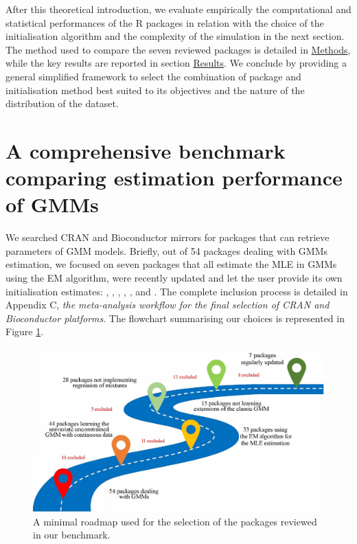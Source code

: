 After this theoretical introduction, we evaluate empirically the
computational and statistical performances of the R packages in relation
with the choice of the initialisation algorithm and the complexity of
the simulation in the next section. The method used to compare the seven reviewed
packages is detailed in \protect\hyperlink{methods}{Methods}, while the key results are reported in
section \protect\hyperlink{results}{Results}. We conclude by providing a general simplified
framework to select the combination of package and initialisation method best suited to its objectives and the nature of the distribution of the dataset.

\hypertarget{a-comprehensive-benchmark-comparing-estimation-performance-of-gmms}{%
\section{A comprehensive benchmark comparing estimation performance of GMMs}\label{a-comprehensive-benchmark-comparing-estimation-performance-of-gmms}}

We searched CRAN and Bioconductor mirrors for packages that can retrieve
parameters of GMM models. Briefly, out of 54 packages dealing with GMMs
estimation, we focused on seven packages that all estimate the
MLE in GMMs using the EM algorithm, were recently
updated and let the user provide its own initialisation estimates:
, , ,
, ,  and . The
complete inclusion process is detailed in Appendix C, \emph{the meta-analysis workflow for the final selection of CRAN and Bioconductor platforms}. The flowchart summarising our choices is represented in Figure \ref{fig:flowchart}.

\begin{figure}

{\centering \includegraphics[width=1\linewidth]{figs/flowchart_packages_selection} 

}

\caption{A minimal roadmap used for the selection of the packages reviewed in our benchmark.}\label{fig:flowchart}
\end{figure}

